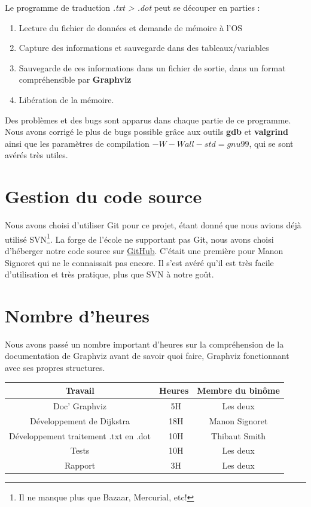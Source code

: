 \documentclass[12pt,a4paper]{report}
\begin{document}
\pagebreak
Le programme de traduction \textit{.txt > .dot} peut se découper en parties :


\begin{enumerate}
\item Lecture du fichier de données et demande de mémoire à l'OS 
\item Capture des informations et sauvegarde dans des tableaux/variables 
\item Sauvegarde de ces informations dans un fichier de sortie, dans un format compréhensible par \textbf{Graphviz}
\item Libération de la mémoire. 
\end{enumerate}

Des problèmes et des bugs sont apparus dans chaque partie de ce programme. Nous avons corrigé le plus de bugs possible grâce aux outils \textbf{gdb} et \textbf{valgrind} ainsi que les paramètres de compilation $-W -Wall -std=gnu99$, qui se sont avérés très utiles.

\section{Gestion du code source}
Nous avons choisi d'utiliser Git pour ce projet, \'{e}tant donn\'{e} que nous avions d\'{e}j\`{a} utilis\'{e} SVN\footnote{Il ne manque plus que Bazaar, Mercurial, etc!}. La forge de l'\'{e}cole ne supportant pas Git, nous avons choisi d'h\'{e}berger notre code source sur \href{https://github.com/Videl/Graph-Visualization-Manager}{GitHub}. C'était une première pour Manon Signoret qui ne le connaissait pas encore. Il s'est avéré qu'il est très facile d'utilisation et très pratique, plus que SVN à notre goût.

\section{Nombre d'heures}
Nous avons pass\'{e} un nombre important d'heures sur la compr\'{e}hension de la documentation de Graphviz avant de savoir quoi faire, Graphviz fonctionnant avec ses propres structures.

\begin{center}
\begin{tabular}{|c|c|c|}
  \hline
  Travail & Heures & Membre du binôme \\
  \hline
  Doc' Graphviz & ~5H & Les deux \\
  \hline
  D\'{e}veloppement de Dijkstra	&	~18H & Manon Signoret \\
  \hline
  D\'{e}veloppement traitement .txt en .dot	&	~10H & Thibaut Smith \\
  \hline
  Tests	&	~10H & Les deux\\ 
  \hline
  Rapport	&	~3H & Les deux\\
  \hline
\end{tabular}
\end{center}
\end{document}
